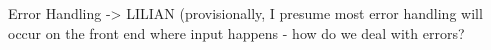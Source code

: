 Error Handling -> LILIAN (provisionally, I presume most error handling will occur on the front end where input happens
  - how do we deal with errors? 
